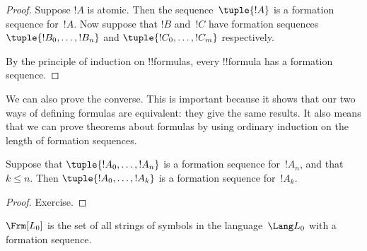 \documentclass[../../../include/open-logic-section]{subfiles}
\begin{document}
\begin{proof}
Suppose $!A$ is atomic. Then the sequence~$\tuple{!A}$ is a
formation sequence for~$!A$.
%
Now suppose that $!B$ and~$!C$ have formation sequences
$\tuple{!B_0,\dotsc,!B_n}$ and $\tuple{!C_0,\dotsc,!C_m}$
respectively.
%
\begin{enumerate}
\end{enumerate}
By the principle of induction on !!{formula}s,
every !!{formula} has a formation sequence.
\end{proof}

We can also prove the converse. This is important because it shows
that our two ways of defining formulas are equivalent: they give
the same results. It also means that we can prove theorems about
formulas by using ordinary induction on the length of formation
sequences.

\begin{lem}
Suppose that $\tuple{!A_0,\dotsc,!A_n}$ is a formation sequence
for~$!A_n$, and that $k \leq n$. Then $\tuple{!A_0,\dotsc,!A_k}$
is a formation sequence for~$!A_k$.
\end{lem}

\begin{proof}
Exercise.
\end{proof}

\begin{thm}
$\Frm[L_0]$ is the set of all strings of symbols
in the language~$\Lang L_0$ with a formation sequence.
\end{thm}
\end{document}
